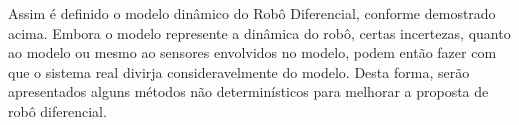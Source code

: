 Assim é definido o modelo dinâmico do Robô Diferencial, conforme demostrado acima.
Embora o modelo represente a dinâmica do robô, certas incertezas, quanto ao modelo ou mesmo ao sensores
envolvidos no modelo, podem então fazer com que o sistema real divirja consideravelmente do modelo.
Desta forma, serão apresentados alguns métodos não determinísticos para melhorar a proposta de robô diferencial.

